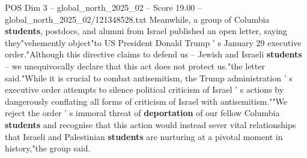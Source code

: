 \begin{textsample}{POS Dim 3 – global\_north\_2025\_02 – Score 19.00 – global\_north\_2025\_02/121348528.txt}
Meanwhile, a group of Columbia \textbf{students}, postdocs, and alumni from Israel published an open letter, saying they"vehemently object"to US President Donald Trump ' s January 29 executive order."Although this directive claims to defend us -- Jewish and Israeli \textbf{students} -- we unequivocally declare that this act does not protect us."the letter said."While it is crucial to combat antisemitism, the Trump administration ' s executive order attempts to silence political criticism of Israel ' s actions by dangerously conflating all forms of criticism of Israel with antisemitism.""We reject the order ' s immoral threat of \textbf{deportation} of our fellow Columbia \textbf{students} and recognise that this action would instead sever vital relationships that Israeli and Palestinian \textbf{students} are nurturing at a pivotal moment in history,"the group said.

\end{textsample}

